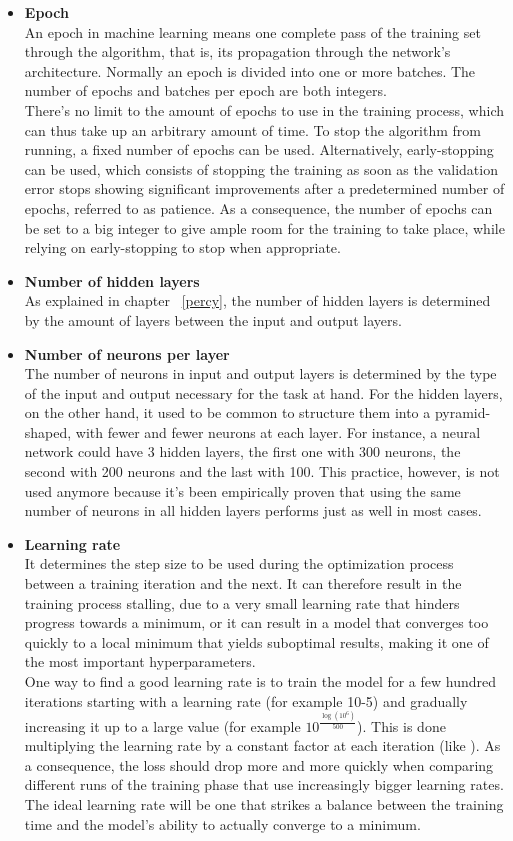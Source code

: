 \begin{itemize}
    \item \textbf{Epoch}
    \\An epoch in machine learning means one complete pass of the training set through the algorithm, that is, its propagation through the network’s architecture. Normally an epoch is divided into one or more batches. The number of epochs and batches per epoch are both integers.
    \\There’s no limit to the amount of epochs to use in the training process, which can thus take up an arbitrary amount of time. To stop the algorithm from running, a fixed number of epochs can be used. Alternatively, early-stopping can be used, which consists of stopping the training as soon as the validation error stops showing significant improvements after a predetermined number of epochs, referred to as patience. As a consequence, the number of epochs can be set to a big integer to give ample room for the training to take place, while relying on early-stopping to stop when appropriate.
    \item \textbf{Number of hidden layers}
    \\As explained in chapter ~\ref{percy}, the number of hidden layers is determined by the amount of layers between the input and output layers.
    \item \textbf{Number of neurons per layer}
    \\The number of neurons in input and output layers is determined by the type of the input and output necessary for the task at hand. For the hidden layers, on the other hand, it used to be common to structure them into a pyramid-shaped, with fewer and fewer neurons at each layer. For instance, a neural network could have 3 hidden layers, the first one with 300 neurons, the second with 200 neurons and the last with 100. 
    This practice, however, is not used anymore because it’s been empirically proven that using the same number of neurons in all hidden layers performs just as well in most cases.
    \item \textbf{Learning rate}
    \\It determines the step size to be used during the optimization process between a training iteration and the next. It can therefore result in the training process stalling, due to a very small learning rate that hinders progress towards a minimum, or it can result in a model that converges too quickly to a local minimum that yields suboptimal results, making it one of the most important hyperparameters.
    \\One way to find a good learning rate is to train the model for a few hundred iterations starting with a learning rate (for example 10-5) and gradually increasing it up to a large value (for example $10^{\frac{\log \left( 10^{6}\right)  }{500} }$). This is done multiplying the learning rate by a constant factor at each iteration (like ). As a  consequence, the loss should drop more and more quickly when comparing different runs of the training phase that use increasingly bigger learning rates. The ideal learning rate will be one that strikes a balance between the training time and the model’s ability to actually converge to a minimum.
    
\end{itemize}
